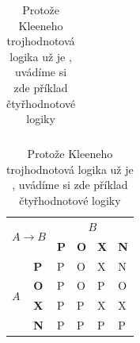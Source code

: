 \documentclass[a4paper, 11 pt]{article}
\begin{document}
\begin{table}[h]
\begin{tabular}{|l|l|l|l|l|l|}
\end{tabular}
\begin{tabular}{|l|l|l|l|l|l|}
\hline
\multicolumn{2}{|l|}{\multirow{2}{*}{$ A \rightarrow B $}} & \multicolumn{4}{c|}{$B$}           \\ \cline{3-6} 
\multicolumn{2}{|l|}{}                      & \textbf{P} & \textbf{O} & \textbf{X} & \textbf{N} \\ \hline
\multirow{4}{*}{$A$}       & \textbf{P}     & P          & O          & X          & N          \\ \cline{2-6} 
                         & \textbf{O}       & P          & O          & P          & O          \\ \cline{2-6} 
                         & \textbf{X}       & P          & P          & X          & X          \\ \cline{2-6} 
                         & \textbf{N}       & P          & P          & P          & P          \\ \hline
\end{tabular}
\caption{
		Protože Kleeneho trojhodnotová logika už je , uvádíme si zde příklad čtyřhodnotové logiky
\label{tabulka:druha}
		}		
\end{table}
\bigskip
{}
\pagebreak
\end{document}
